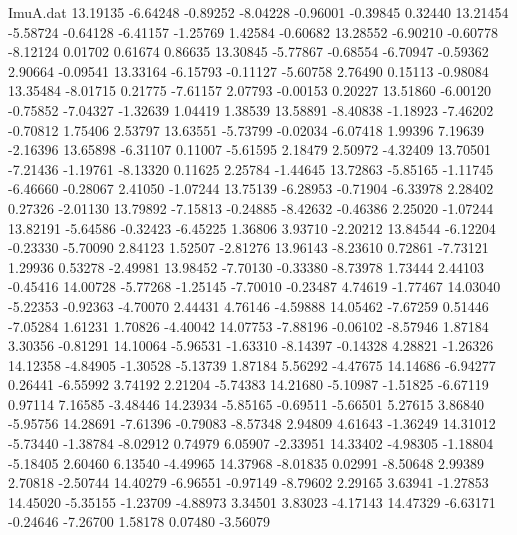 \begin{filecontents}{ImuA.dat}
  13.19135   -6.64248   -0.89252   -8.04228   -0.96001   -0.39845    0.32440
  13.21454   -5.58724   -0.64128   -6.41157   -1.25769    1.42584   -0.60682
  13.28552   -6.90210   -0.60778   -8.12124    0.01702    0.61674    0.86635
  13.30845   -5.77867   -0.68554   -6.70947   -0.59362    2.90664   -0.09541
  13.33164   -6.15793   -0.11127   -5.60758    2.76490    0.15113   -0.98084
  13.35484   -8.01715    0.21775   -7.61157    2.07793   -0.00153    0.20227
  13.51860   -6.00120   -0.75852   -7.04327   -1.32639    1.04419    1.38539
  13.58891   -8.40838   -1.18923   -7.46202   -0.70812    1.75406    2.53797
  13.63551   -5.73799   -0.02034   -6.07418    1.99396    7.19639   -2.16396
  13.65898   -6.31107    0.11007   -5.61595    2.18479    2.50972   -4.32409
  13.70501   -7.21436   -1.19761   -8.13320    0.11625    2.25784   -1.44645
  13.72863   -5.85165   -1.11745   -6.46660   -0.28067    2.41050   -1.07244
  13.75139   -6.28953   -0.71904   -6.33978    2.28402    0.27326   -2.01130
  13.79892   -7.15813   -0.24885   -8.42632   -0.46386    2.25020   -1.07244
  13.82191   -5.64586   -0.32423   -6.45225    1.36806    3.93710   -2.20212
  13.84544   -6.12204   -0.23330   -5.70090    2.84123    1.52507   -2.81276
  13.96143   -8.23610    0.72861   -7.73121    1.29936    0.53278   -2.49981
  13.98452   -7.70130   -0.33380   -8.73978    1.73444    2.44103   -0.45416
  14.00728   -5.77268   -1.25145   -7.70010   -0.23487    4.74619   -1.77467
  14.03040   -5.22353   -0.92363   -4.70070    2.44431    4.76146   -4.59888
  14.05462   -7.67259    0.51446   -7.05284    1.61231    1.70826   -4.40042
  14.07753   -7.88196   -0.06102   -8.57946    1.87184    3.30356   -0.81291
  14.10064   -5.96531   -1.63310   -8.14397   -0.14328    4.28821   -1.26326
  14.12358   -4.84905   -1.30528   -5.13739    1.87184    5.56292   -4.47675
  14.14686   -6.94277    0.26441   -6.55992    3.74192    2.21204   -5.74383
  14.21680   -5.10987   -1.51825   -6.67119    0.97114    7.16585   -3.48446
  14.23934   -5.85165   -0.69511   -5.66501    5.27615    3.86840   -5.95756
  14.28691   -7.61396   -0.79083   -8.57348    2.94809    4.61643   -1.36249
  14.31012   -5.73440   -1.38784   -8.02912    0.74979    6.05907   -2.33951
  14.33402   -4.98305   -1.18804   -5.18405    2.60460    6.13540   -4.49965
  14.37968   -8.01835    0.02991   -8.50648    2.99389    2.70818   -2.50744
  14.40279   -6.96551   -0.97149   -8.79602    2.29165    3.63941   -1.27853
  14.45020   -5.35155   -1.23709   -4.88973    3.34501    3.83023   -4.17143
  14.47329   -6.63171   -0.24646   -7.26700    1.58178    0.07480   -3.56079

\end{filecontents}
